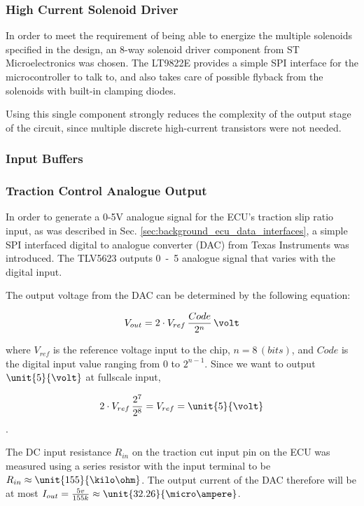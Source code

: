 \subsubsection{High Current Solenoid Driver}

In order to meet the requirement of being able to energize the multiple solenoids specified in the design, an 8-way solenoid driver component from ST Microelectronics was chosen. The LT9822E provides a simple SPI interface for the microcontroller to talk to, and also takes care of possible flyback from the solenoids with built-in clamping diodes.

Using this single component strongly reduces the complexity of the output stage of the circuit, since multiple discrete high-current transistors were not needed.

\subsubsection{Input Buffers}


\subsubsection{Traction Control Analogue Output}

In order to generate a 0-5V analogue signal for the ECU's traction slip ratio input, as was described in Sec. \ref{sec:background_ecu_data_interfaces}, a simple SPI interfaced digital to analogue converter (DAC) from Texas Instruments was introduced. The TLV5623 outputs \unit{0-5}{\volt} analogue signal that varies with the digital input.

The output voltage from the DAC can be determined by the following equation:

\begin{equation}
V_{out}=2\cdot{V_{ref}}\,\frac{Code}{2^{n}}\,\volt
\end{equation}

where $V_{ref}$ is the reference voltage input to the chip, $n=8\,(bits)$, and $Code$ is the digital input value ranging from $0$ to $2^{n-1}$. Since we want to output $\unit{5}{\volt}$ at fullscale input,

\begin{equation}
2\cdot{V_{ref}}\,\frac{2^{7}}{2^{8}}=V_{ref}=\unit{5}{\volt}
\end{equation}.

The DC input resistance $R_{in}$ on the traction cut input pin on the ECU was measured using a series resistor with the input terminal to be $R_{in}\approx\unit{155}{\kilo\ohm}$. The output current of the DAC therefore will be at most $I_{out}=\frac{5v}{155k}\approx\unit{32.26}{\micro\ampere}$.